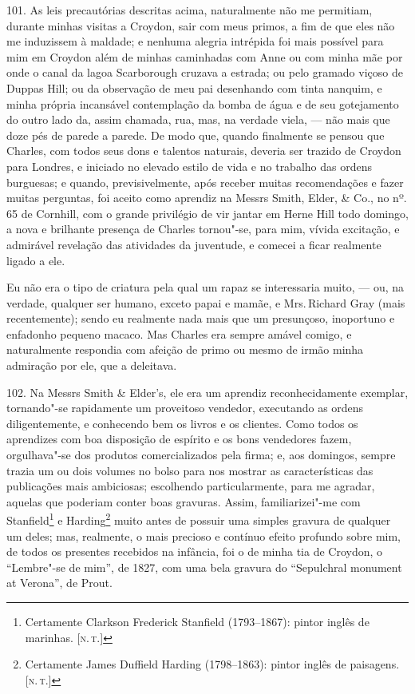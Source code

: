 101. As leis precautórias descritas acima, naturalmente não me
permitiam, durante minhas visitas a Croydon, sair com meus primos, a fim
de que eles não me induzissem à maldade; e nenhuma alegria intrépida foi
mais possível para mim em Croydon além de minhas caminhadas com Anne ou
com minha mãe por onde o canal da lagoa Scarborough cruzava a estrada;
ou pelo gramado viçoso de Duppas Hill; ou da observação de meu pai
desenhando com tinta nanquim, e minha própria incansável contemplação da
bomba de água e de seu gotejamento do outro lado da, assim chamada, rua,
mas, na verdade viela, --- não mais que doze pés de parede a parede. De
modo que, quando finalmente se pensou que Charles, com todos seus dons e
talentos naturais, deveria ser trazido de Croydon para Londres, e
iniciado no elevado estilo de vida e no trabalho das ordens burguesas; e
quando, previsivelmente, após receber muitas recomendações e fazer
muitas perguntas, foi aceito como aprendiz na Messrs Smith, Elder, \&
Co., no nº. 65 de Cornhill, com o grande privilégio de vir jantar em
Herne Hill todo domingo, a nova e brilhante presença de Charles
tornou"-se, para mim, vívida excitação, e admirável revelação das
atividades da juventude, e comecei a ficar realmente ligado a ele.

Eu não era o tipo de criatura pela qual um rapaz se interessaria muito,
--- ou, na verdade, qualquer ser humano, exceto papai e mamãe, e Mrs.\,Richard Gray (mais recentemente); sendo eu realmente nada mais que um
presunçoso, inoportuno e enfadonho pequeno macaco. Mas Charles era
sempre amável comigo, e naturalmente respondia com afeição de primo ou
mesmo de irmão minha admiração por ele, que a deleitava.

102. Na Messrs Smith \& Elder's, ele era um aprendiz reconhecidamente
exemplar, tornando"-se rapidamente um proveitoso vendedor, executando as
ordens diligentemente, e conhecendo bem os livros e os clientes. Como
todos os aprendizes com boa disposição de espírito e os bons vendedores
fazem, orgulhava"-se dos produtos comercializados pela firma; e, aos
domingos, sempre trazia um ou dois volumes no bolso para nos mostrar as
características das publicações mais ambiciosas; escolhendo
particularmente, para me agradar, aquelas que poderiam conter boas
gravuras. Assim, familiarizei"-me com Stanfield\footnote{Certamente
  Clarkson Frederick Stanfield (1793--1867): pintor inglês de marinhas.
  {[}\textsc{n.\,t.}{]}} e Harding\footnote{Certamente James Duffield Harding
  (1798--1863): pintor inglês de paisagens. {[}\textsc{n.\,t.}{]}} muito antes
de possuir uma simples gravura de qualquer um deles; mas, realmente, o
mais precioso e contínuo efeito profundo sobre mim, de todos os
presentes recebidos na infância, foi o de minha tia de Croydon, o
``Lembre"-se de mim'', de 1827, com uma bela gravura do ``Sepulchral
monument at Verona'', de Prout.

